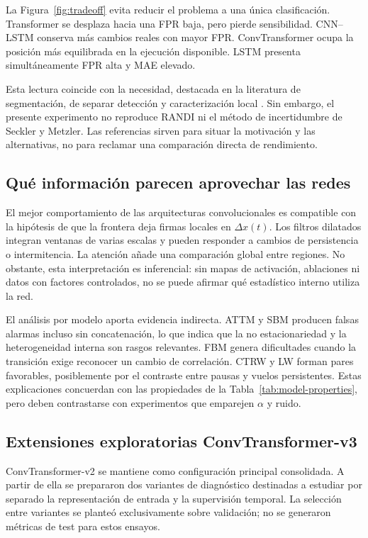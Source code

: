 \documentclass[a4paper,12pt]{article}
\begin{document}
La Figura~\ref{fig:tradeoff} evita reducir el problema a una única clasificación. Transformer se desplaza hacia una FPR baja, pero pierde sensibilidad. CNN--LSTM conserva más cambios reales con mayor FPR. ConvTransformer ocupa la posición más equilibrada en la ejecución disponible. LSTM presenta simultáneamente FPR alta y MAE elevado.

Esta lectura coincide con la necesidad, destacada en la literatura de segmentación, de separar detección y caracterización local \cite{argun2021classification,requena2023pointwise,seckler2024changepoint}. Sin embargo, el presente experimento no reproduce RANDI ni el método de incertidumbre de Seckler y Metzler. Las referencias sirven para situar la motivación y las alternativas, no para reclamar una comparación directa de rendimiento.

\subsection{Qué información parecen aprovechar las redes}

El mejor comportamiento de las arquitecturas convolucionales es compatible con la hipótesis de que la frontera deja firmas locales en $\Delta x(t)$. Los filtros dilatados integran ventanas de varias escalas y pueden responder a cambios de persistencia o intermitencia. La atención añade una comparación global entre regiones. No obstante, esta interpretación es inferencial: sin mapas de activación, ablaciones ni datos con factores controlados, no se puede afirmar qué estadístico interno utiliza la red.

El análisis por modelo aporta evidencia indirecta. ATTM y SBM producen falsas alarmas incluso sin concatenación, lo que indica que la no estacionariedad y la heterogeneidad interna son rasgos relevantes. FBM genera dificultades cuando la transición exige reconocer un cambio de correlación. CTRW y LW forman pares favorables, posiblemente por el contraste entre pausas y vuelos persistentes. Estas explicaciones concuerdan con las propiedades de la Tabla~\ref{tab:model-properties}, pero deben contrastarse con experimentos que emparejen $\alpha$ y ruido.

\subsection{Extensiones exploratorias ConvTransformer-v3}
\label{sec:convtransformer-v3-exploratory}

ConvTransformer-v2 se mantiene como configuración principal consolidada. A partir de ella se prepararon dos variantes de diagnóstico destinadas a estudiar por separado la representación de entrada y la supervisión temporal. La selección entre variantes se planteó exclusivamente sobre validación; no se generaron métricas de test para estos ensayos.
\end{document}
